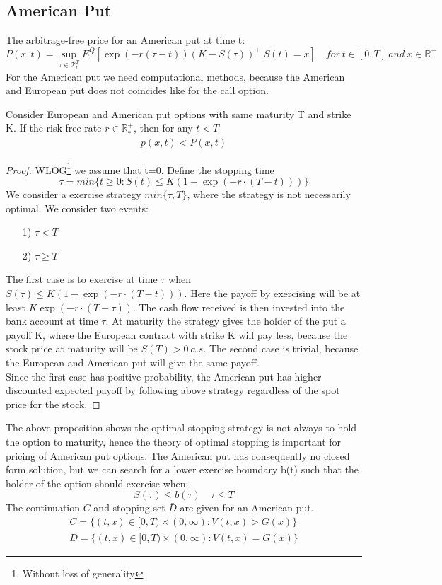 \subsection{American Put}\label{americanPut}
The arbitrage-free price for an American put at time t:
\begin{equation}\label{AmericanPutPrice}
P(x,t)=\sup_{\tau \in \mathcal{T}_t^T} E^Q[\exp(-r(\tau-t)) (K-S(\tau))^+|S(t)=x] \quad for \ t\in [0,T] \ and \ x\in\mathbb{R}^+
\end{equation}
For the American put we need computational methods, because the American and European put does not coincides like for the call option.

\begin{proposition}{}
Consider European and American put options with same maturity T and strike K. If the risk free rate $r\in \mathbb{R}_*^+$, then for any $t<T$
\begin{equation}
\begin{split}
p(x,t)<P(x,t)
\end{split}
\end{equation}
\begin{proof}
WLOG\footnote{Without loss of generality} we assume that t=0. Define the stopping time
$$\tau = min \{t\geq 0 : S(t) \leq K(1-\exp(-r\cdot (T-t)))\}$$
We consider a exercise strategy $min\{\tau, T\}$, where the strategy is not necessarily optimal. We consider two events:
\begin{enumerate}
\item[1)] $\tau<T$
\item[2)] $\tau \geq T$
\end{enumerate}
The first case is to exercise at time $\tau$ when $S(\tau) \leq K(1-\exp(-r\cdot (T-t)))$. Here the payoff by exercising will be at least $K\exp(-r\cdot (T-\tau))$. The cash flow received is then invested into the bank account at time $\tau$. At maturity the strategy gives the holder of the put a payoff K, where the European contract with strike K will pay less, because the stock price at maturity will be $S(T)>0 \ a.s.$
The second case is trivial, because the European and American put will give the same payoff. \\
Since the first case has positive probability, the American put has higher discounted expected payoff by following above strategy regardless of the spot price for the stock. 
\end{proof}
\end{proposition}
The above proposition shows the optimal stopping strategy is not always to hold the option to maturity, hence the theory of optimal stopping is important for pricing of American put options. The American put has consequently no closed form solution, but we can search for a lower exercise boundary b(t) such that the holder of the option should exercise when:
$$S(\tau)\leq b(\tau) \quad \tau \leq T$$
The continuation $C$ and stopping set $\bar{D}$ are given for an American put.
\begin{align*}
C=\{(t,x) \in [0,T) \times (0,\infty) : V(t,x) > G(x) \}\\
\bar{D}=\{(t,x) \in [0,T) \times (0,\infty) : V(t,x) = G(x) \}
\end{align*} 

